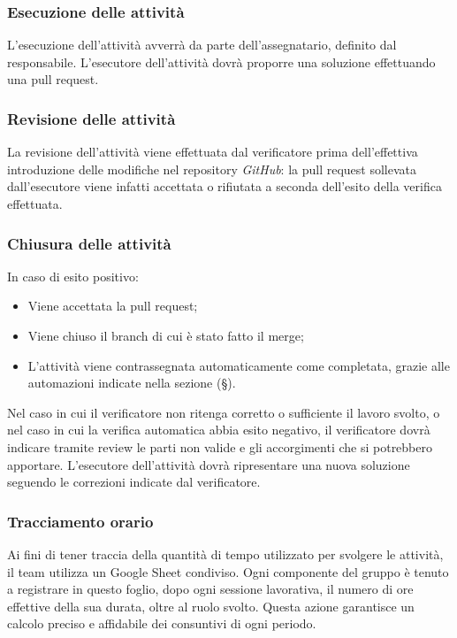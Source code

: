 \documentclass[10pt, a4paper]{article}
\begin{document}
\subsubsection{Esecuzione delle attività}
L'esecuzione dell'attività avverrà da parte dell'assegnatario, definito dal responsabile. L'esecutore dell'attività dovrà proporre una soluzione effettuando una pull request.
\subsubsection{Revisione delle attività}
La revisione dell'attività viene effettuata dal verificatore prima dell'effettiva introduzione delle modifiche nel repository \textit{GitHub}: la pull request sollevata dall'esecutore viene infatti accettata o rifiutata a seconda dell'esito della verifica effettuata.
\subsubsection{Chiusura delle attività}
In caso di esito positivo:
\begin{itemize}
    \item Viene accettata la pull request;
    \item Viene chiuso il branch di cui è stato fatto il merge;
    \item L'attività viene contrassegnata automaticamente come completata, grazie alle automazioni indicate nella sezione (\S {}).
\end{itemize}
Nel caso in cui il verificatore non ritenga corretto o sufficiente il lavoro svolto, o nel caso in cui la verifica automatica abbia esito negativo, il verificatore dovrà indicare tramite review le parti non valide e gli accorgimenti che si potrebbero apportare.
L'esecutore dell'attività dovrà ripresentare una nuova soluzione seguendo le correzioni indicate dal verificatore.

\subsubsection{Tracciamento orario}
Ai fini di tener traccia della quantità di tempo utilizzato per svolgere le attività, il team utilizza un Google Sheet condiviso.
Ogni componente del gruppo è tenuto a registrare in questo foglio, dopo ogni sessione lavorativa, il numero di ore effettive della sua durata, oltre al ruolo svolto.
Questa azione garantisce un calcolo preciso e affidabile dei consuntivi di ogni periodo. 
\end{document}
